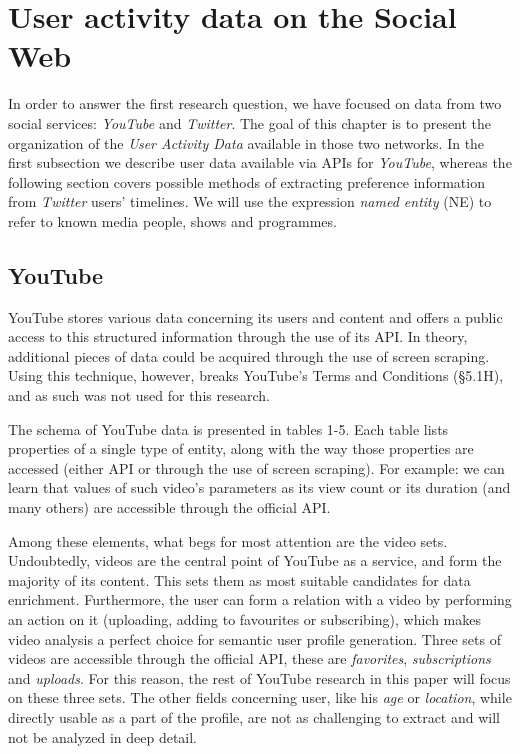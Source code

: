 \section{User activity data on the Social Web} 
\label{sec:uad}
In order to answer the first research question, we have focused on data from two social services: \textit{YouTube} and
\textit{Twitter}. The goal of this chapter is to present the organization of the \textit{User Activity Data} available
in those two networks. In the first subsection we describe user data available via APIs for
\textit{YouTube}, whereas the following section covers possible methods of extracting preference information from \textit{Twitter} users' timelines. We will use the expression \textit{named entity} (NE) to refer to
known media people, shows and programmes.

\subsection{YouTube}

YouTube stores various data concerning its users and content and offers a public
access to this structured information through the use of its API. In theory, additional
pieces of data could be acquired through the use of screen scraping. Using this
technique, however, breaks YouTube's Terms and Conditions (\S 5.1H), and as such
was not used for this research.

The schema of YouTube data is presented in tables 1-5.  Each table lists
properties of a single type of entity, along with the way those properties are
accessed (either API or through the use of screen scraping). For example:
we can learn that values of such video's parameters as its view count or
its duration (and many others) are accessible through the official API.

Among these elements, what begs for most attention are the video sets.
Undoubtedly, videos are the central point of YouTube as a service, and form the
majority of its content. This sets them as most suitable candidates for data
enrichment. Furthermore, the user can form a relation with a video by performing
an action on it (uploading, adding to favourites or subscribing), which makes
video analysis a perfect choice for semantic user profile generation.  Three
sets of videos are accessible through the official API, these are
\emph{favorites}, \emph{subscriptions} and \emph{uploads}. For this reason, the
rest of YouTube research in this paper will focus on these three sets. The other
fields concerning user, like his \textit{age} or \textit{location}, while
directly usable as a part of the profile, are not as challenging to extract and
will not be analyzed in deep detail.

